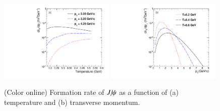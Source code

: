 \documentclass[review]{elsarticle}
\newcommand{\Jpsi}{\ensuremath{J\hspace{-.08em}/\hspace{-.14em}\psi}\xspace} %
\begin{document}
{  \begin{figure}
    \includegraphics[width=0.49\textwidth]{Figures/Quarkonia_276TeV/Fig4a_FRateVsT.pdf}
    \includegraphics[width=0.49\textwidth]{Figures/Quarkonia_276TeV/Fig4b_FRateVsPt.pdf}
    \caption{(Color online) Formation rate of  $\Jpsi$ as a function of (a) temperature and 
      (b) transverse momentum.}
    \label{fig:ForRateVsTempAndPt}
  \end{figure}
  
}
\end{document}
